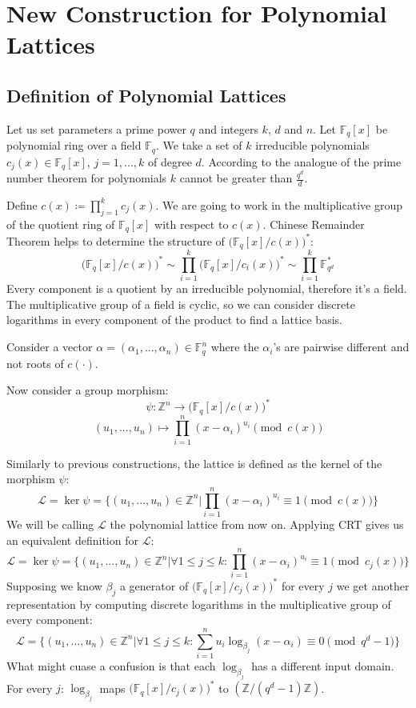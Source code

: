 \documentclass[12pt]{article}
\newcommand{\FF}{\mathbb{F}}
\newcommand{\ZZ}{\mathbb{Z}}
\newcommand{\LL}{\mathcal{L}}
\begin{document}
\section{New Construction for Polynomial Lattices}
\label{sec:polynomials}



\subsection{Definition of Polynomial Lattices}
\label{subsec:def_polynomials}


Let us set parameters a prime power $q$ and integers $k$, $d$ and $n$. Let $\FF_{q}[x]$ be polynomial ring over a field  $\FF_{q}$. We take a set of $k$ irreducible polynomials $c_{j}(x) \in \FF_{q}[x]$, $j =1, ...,k$ of degree $d$. According to the analogue of the prime number theorem for polynomials \cite{[GC65]} $k$ cannot be greater than $\frac{q^d}{d}$.

Define $c(x) \coloneqq \prod_{j = 1}^{k} c_{j}(x)$. We are going to work in the multiplicative group of the quotient ring of  $\FF_{q}[x]$ with respect to $c(x)$.
Chinese Remainder Theorem helps to determine the structure of $\big(\FF_{q}[x]/c(x)\big)^{*}$:
\[
    \big(\FF_{q}[x]/c(x)\big)^{*} \sim \prod_{i=1}^{k}\big(\FF_{q}[x]/c_{i}(x)\big)^{*} \sim \prod_{i=1}^{k}\FF_{q^{d}}^*
\]
Every component is a quotient by an irreducible polynomial, therefore it's a field. The multiplicative group of a field is cyclic, so we can consider discrete logarithms in every component of the product to find a lattice basis.

Consider a vector $\alpha = (\alpha_{1}, ... , \alpha_{n}) \in \FF_{q}^{n}$ where the $\alpha_{i}$'s are pairwise different and not roots of $c(\cdot)$.


Now consider a group morphism:
\[
    \psi : \ZZ^{n} \rightarrow \big(\FF_{q}[x]/c(x)\big)^{*}
\]
\[
    (u_{1}, ..., u_{n}) \mapsto \prod_{i=1}^{n}(x - \alpha_{i})^{u_{i}} \pmod{c(x)}
\]

Similarly to previous constructions, the lattice is defined as the kernel of the morphism $\psi$:
\[
    \LL = \ker \psi = \{(u_{1}, ..., u_{n}) \in \ZZ^{n} | \prod_{i=1}^{n}(x - \alpha_{i})^{u_{i}} \equiv 1 \pmod{c(x)}\}
\]
We will be calling $\LL$ the polynomial lattice from now on. Applying CRT gives us an equivalent definition for $\LL$:
\[
    \LL = \ker \psi = \{(u_{1}, ..., u_{n}) \in \ZZ^{n} |  \forall 1 \leq j \leq k: \prod_{i=1}^{n}(x - \alpha_{i})^{u_{i}} \equiv 1 \pmod{c_{j}(x)}\}
\]
Supposing we know $\beta_{j}$ a generator of $\big(\FF_{q}[x]/c_{j}(x)\big)^{*}$ for every $j$ we get another representation by computing discrete logarithms in the multiplicative group of every component:
\[
    \LL = \{(u_{1}, ..., u_{n}) \in \ZZ^{n} | \forall 1 \leq j \leq k: \sum_{i=1}^{n}u_{i}\log_{\beta_{j}}(x - \alpha_{i}) \equiv 0 \pmod{q^{d} -1}\}
\]
What might cuase a confusion is that each $\log_{\beta_{j}}$ has a different input domain. For every $j$:  $\log_{\beta_{j}}$ maps $\big(\FF_{q}[x]/c_{j}(x)\big)^{*}$ to $(\ZZ/(q^{d} - 1)\ZZ)$.
\end{document}
